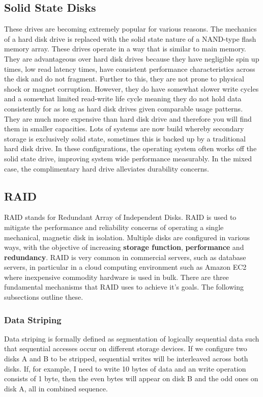 \documentclass[10pt,a4paper]{article}
\begin{document}
\subsection{Solid State Disks}
These drives are becoming extremely popular for various reasons. The mechanics of a hard disk drive is replaced with the solid state nature of a NAND-type flash memory array. These drives operate in a way that is similar to main memory. They are advantageous over hard disk drives because they have negligible spin up times, low read latency times, have consistent performance characteristics across the disk and do not fragment. Further to this, they are not prone to physical shock or magnet corruption. However, they do have somewhat slower write cycles and a somewhat limited read-write life cycle meaning they do not hold data consistently for as long as hard disk drives given comparable usage patterns. They are much more expensive than hard disk drive and therefore you will find them in smaller capacities. Lots of systems are now build whereby secondary storage is exclusively solid state, sometimes this is backed up by a traditional hard disk drive. In these configurations, the operating system often works off the solid state drive, improving system wide performance measurably. In the mixed case, the complimentary hard drive alleviates durability concerns. 
\subsection{RAID} 
RAID stands for Redundant Array of Independent Disks. RAID is used to mitigate the performance and reliability concerns of operating a single mechanical, magnetic disk in isolation. Multiple disks are configured in various ways, with the objective of increasing {\bf storage function}, {\bf performance} and {\bf redundancy}. RAID is very common in commercial servers, such as database servers, in particular in a cloud computing environment such as Amazon EC2 where inexpensive commodity hardware is used in bulk. There are three fundamental mechanisms that RAID uses to achieve it's goals. The following subsections outline these. 
\subsubsection{Data Striping}
Data striping is formally defined as segmentation of logically sequential data such that sequential accesses occur on different storage devices. If we configure two disks A and B to be stripped, sequential writes will be interleaved across both disks. If, for example, I need to write 10 bytes of data and an write operation consists of 1 byte, then the even bytes will appear on disk B and the odd ones on disk A, all in combined sequence. 
\end{document}

